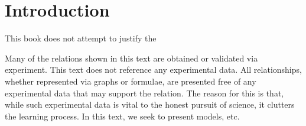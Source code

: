 \chapter{Introduction}

This book does not attempt to justify the 

Many of the relations shown in this text are obtained or validated via
experiment. This text does not reference any experimental data. All
relationships, whether represented via graphs or formulae, are presented free
of any experimental data that may support the relation. The reason for this is
that, while such experimental data is vital to the honest pursuit of science,
it clutters the learning process. In this text, we seek to present models, etc.
